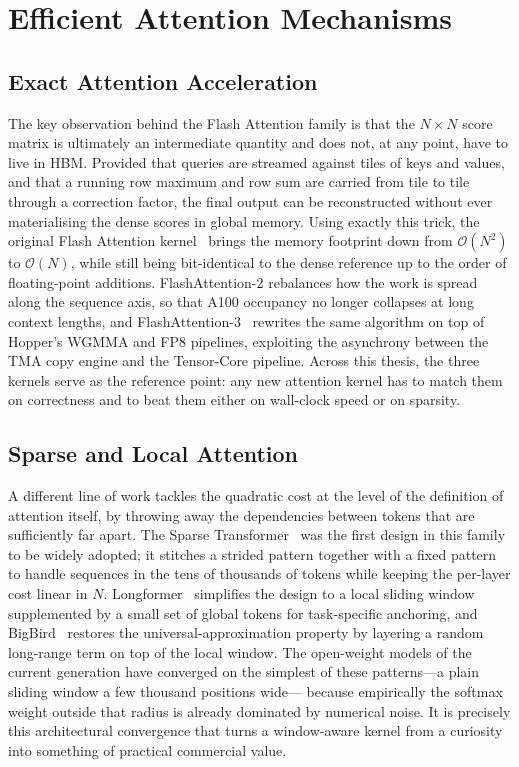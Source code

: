 \section{Efficient Attention Mechanisms}\label{sec:lit_attn}

\subsection{Exact Attention Acceleration}\label{sec:lit_flashattn}
The key observation behind the Flash Attention family is that the
$N \times N$ score matrix is ultimately an intermediate quantity and
does not, at any point, have to live in HBM. Provided that queries
are streamed against tiles of keys and values, and that a running
row maximum and row sum are carried from tile to tile through a
correction factor, the final output can be reconstructed without
ever materialising the dense scores in global memory. Using exactly
this trick, the original Flash Attention
kernel~\cite{dao2022flashattention} brings the memory footprint down
from $\mathcal{O}(N^2)$ to $\mathcal{O}(N)$, while still being
bit-identical to the dense reference up to the order of
floating-point additions. FlashAttention-2
\cite{dao2023flashattention2} rebalances how the work is spread
along the sequence axis, so that A100 occupancy no longer collapses
at long context lengths, and
FlashAttention-3~\cite{dao2024flashattention3} rewrites the same
algorithm on top of Hopper's WGMMA and FP8 pipelines, exploiting the
asynchrony between the TMA copy engine and the Tensor-Core
pipeline. Across this thesis, the three kernels serve as the
reference point: any new attention kernel has to match them on
correctness and to beat them either on wall-clock speed or on
sparsity.

\subsection{Sparse and Local Attention}\label{sec:lit_sparse}
A different line of work tackles the quadratic cost at the level of
the definition of attention itself, by throwing away the
dependencies between tokens that are sufficiently far apart. The
Sparse Transformer~\cite{child2019generating} was the first design
in this family to be widely adopted; it stitches a strided pattern
together with a fixed pattern to handle sequences in the tens of
thousands of tokens while keeping the per-layer cost linear in $N$.
Longformer~\cite{beltagy2020longformer} simplifies the design to a
local sliding window supplemented by a small set of global tokens
for task-specific anchoring, and BigBird~\cite{zaheer2020bigbird}
restores the universal-approximation property by layering a random
long-range term on top of the local window. The open-weight models
of the current generation have converged on the simplest of these
patterns---a plain sliding window a few thousand positions wide---
because empirically the softmax weight outside that radius is
already dominated by numerical noise. It is precisely this
architectural convergence that turns a window-aware kernel from a
curiosity into something of practical commercial value.

